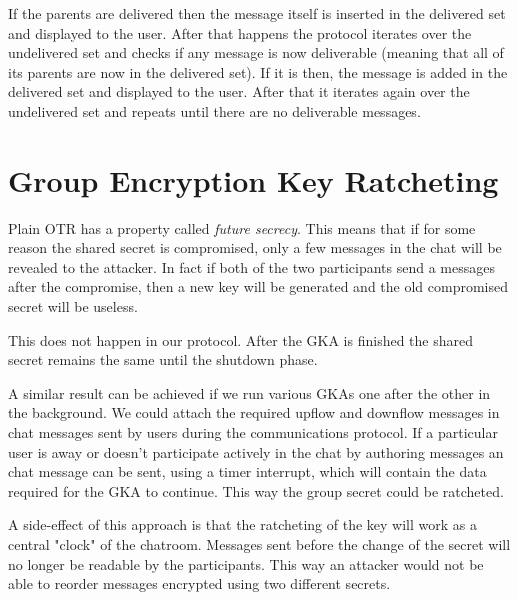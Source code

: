 If the parents are delivered then the message itself is inserted in the delivered  set and displayed to the user.
After that happens the protocol iterates over the undelivered set and checks if any message is now deliverable (meaning that all of its parents are now in the delivered set).
If it is then, the message is added in the delivered set and displayed to the user.
After that it iterates again over the undelivered set and repeats until there are no deliverable messages.

\section{Group Encryption Key Ratcheting}

Plain OTR has a property called \emph{future secrecy}.
This means that if for some reason the shared secret is compromised, only a few messages in the chat will be revealed to the attacker.
In fact if both of the two participants send a messages after the compromise, then a new key will be generated and the old compromised secret will be useless.

This does not happen in our protocol.
After the GKA is finished the shared secret remains the same until the shutdown phase.

A similar result can be achieved if we run various GKAs one after the other in the background.
We could attach the required upflow and downflow messages in chat messages sent by users during the communications protocol.
If a particular user is away or doesn't participate actively in the chat by authoring messages an chat message can be sent, using a timer interrupt, which will contain the data required for the GKA to continue.
This way the group secret could be ratcheted.

A side-effect of this approach is that the ratcheting of the key will work as a central "clock" of the chatroom.
Messages sent before the change of the secret will no longer be readable by the participants.
This way an attacker would not be able to reorder messages encrypted using two different secrets.
